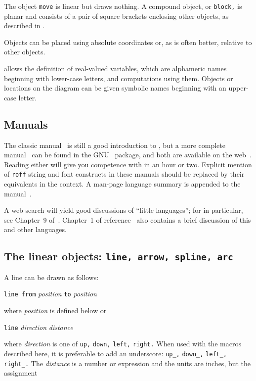 The object {\tt move} is linear but draws nothing.  A compound object,
or {\tt block,} is planar and consists of a pair of square brackets enclosing
other objects, as described in .

Objects can be placed using absolute coordinates or,
as is often better, relative to other objects.

\Pic allows the definition of real-valued variables, which are alphameric
names beginning with lower-case letters, and computations using them.
Objects or locations on the diagram can be given symbolic names
beginning with an upper-case letter.

\subsection{Manuals\label{Manuals:}}
The classic \pic manual~\cite{KRpic} is still a good introduction to \pic, but
a more complete manual~\cite{Raymond95} can be found in the GNU \groff\
package, and both are available on the web~\cite{KRpic,Raymond95}.  Reading
either will give you competence with \pic in an hour or two.  Explicit mention
of {\tt *roff} string and font constructs in these manuals should be replaced by
their equivalents in the \latex context.  A man-page language summary is
appended to the \dpic manual~\cite{Aplevich2011}.

A web search will yield good discussions of ``little languages'';
for \pic in particular, see Chapter~9 of~\cite{Bentley88}.
Chapter~1 of reference~\cite{Goossens97} also contains a brief
discussion of this and other languages.

\subsection{The linear objects: {\tt line, arrow, spline, arc}%
\label{Linearobjects:}}
A line can be drawn as follows:

{\tt line from} {\sl position} {\tt to} {\sl position}

\noindent
where {\sl position} is defined below or

{\tt line} {\sl direction} {\sl distance}

\noindent
where {\sl direction} is one of {\tt up,} {\tt down,} {\tt left,}
{\tt right.}  When used with the \Mfour macros described here, it is
preferable to add an underscore: {\tt up\_,} {\tt down\_,} {\tt left\_,}
{\tt right\_.}  The {\sl distance} is a number or expression
and the units are inches, but the assignment

